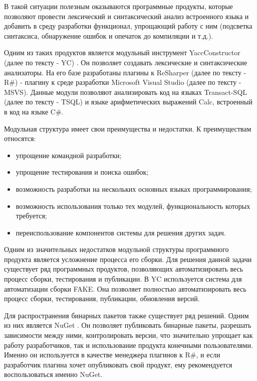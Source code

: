 \documentclass{matmex-diploma-custom}
\begin{document}
В такой ситуации полезным оказываются программные продукты, которые позволяют провести лексический и синтаксический анализ встроенного языка и добавить в среду разработки функционал, упрощающий работу с ним (подсветка синтаксиса, обнаружение ошибок и опечаток до компиляции и т.д.).

Одним из таких продуктов является модульный инструмент YaccConstructor (далее по тексту - YC) \cite{yc}. Он позволяет создавать лексические и синтаксические анализаторы. На его базе разработаны плагины к ReSharper (далее по тексту - R\#) \cite{resharper} - плагину к среде разработки Microsoft Visual Studio (далее по тексту - MSVS). Данные модули позволяют анализировать код на языках Transact-SQL (далее по тексту - TSQL) и языке арифметических выражений Calc, встроенный в код на языке C\#.

Модульная структура имеет свои преимущества и недостатки. К преимуществам относятся:

\begin{itemize}
\item
упрощение командной разработки;
\item
упрощение тестирования и поиска ошибок;
\item
возможность разработки на нескольких основных языках программирования;
\item
возможность использования только тех модулей, функциональность которых требуется;
\item
переиспользование компонентов системы для решения других задач.
\end{itemize}

Одним из значительных недостатков модульной структуры программного продукта является усложнение процесса его сборки. Для решения данной задачи существует ряд программных продуктов, позволяющих автоматизировать весь процесс сборки, тестирования и публикации. В YC используется система для автоматизации сборки FAKE. Она позволяет полностью автоматизировать весь процесс сборки, тестирования, публикации, обновления версий.

Для распространения бинарных пакетов также существует ряд решений. Одним из них является NuGet \cite{nuget}. Он позволяет публиковать бинарные пакеты, разрешать зависимости между ними, контролировать версии, что значительно упрощает как работу разработчиков, так и использование продукта конечными пользователями. Именно он используется в качестве менеджера плагинов к R\#, и если разработчик плагина хочет опубликовать свой продукт, ему рекомендуется воспользоваться именно NuGet.
\end{document}
